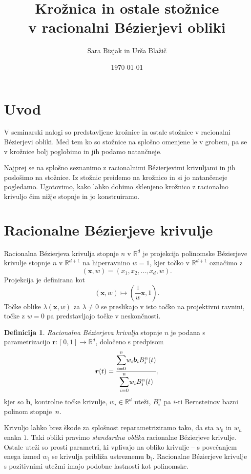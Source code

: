 \documentclass[a4paper,11pt]{article}
\title{Krožnica in ostale stožnice \\
v racionalni B\'ezierjevi obliki
}
\author{Sara Bizjak in Urša Blažič}
\date{\today}
\theoremstyle{definition}
\newtheorem*{definicija}{Definicija}
\theoremstyle{plain}
\begin{document}
\maketitle

\section{Uvod}
V seminarski nalogi so predstavljene krožnice in ostale stožnice v racionalni B\'ezierjevi obliki. Med tem ko so stožnice na splošno omenjene le v grobem, pa se v krožnice bolj poglobimo in jih podamo natančneje.

Najprej se na splošno seznanimo z racionalnimi B\'ezierjevimi krivuljami in jih poslošimo na stožnice. Iz stožnic preidemo na krožnico in si jo natančeneje pogledamo. Ugotovimo, kako lahko dobimo sklenjeno krožnico z racionalno krivuljo čim nižje stopnje in jo konstruiramo.



\section{Racionalne B\'ezierjeve krivulje}

Racionalna B\'ezierjeva krivulja stopnje $n$ v $\mathbb{R}^d$ je projekcija polinomske B\'ezierjeve krivulje stopnje $n$ v $\mathbb{R}^{d+1}$ na hiperravnino $w=1$, kjer točko v  $\mathbb{R}^{d+1}$  označimo z
$$(\boldsymbol{x},w)=(x_1,x_2,\dots,x_d,w).$$
Projekcija je definirana kot
$$(\boldsymbol{x},w)\mapsto (\frac{1}{w}\boldsymbol{x},1).$$
Točke oblike $\lambda(\boldsymbol{x}, w)$ za $\lambda\neq 0$ se preslikajo v isto točko na projektivni ravnini, točke z
$w = 0$ pa predstavljajo točke v neskončnosti.

\begin{definicija}
\emph{Racionalna B\'ezierjeva krivulja} stopnje $n$ je podana s parametrizacijo $\boldsymbol{r}:[0,1]\rightarrow \mathbb{R}^d$, določeno s predpisom
$$\boldsymbol{r}(t)=\frac{\mathlarger{\sum}_{i=0}^n w_i\boldsymbol{b}_iB_i^n(t)}{\mathlarger{\sum}_{i=0}^n w_iB_i^n(t)},$$
kjer so $\boldsymbol{b}_i$ kontrolne točke krivulje, $w_i\in\mathbb{R}^d$ uteži, $B_i^n$ pa $i$-ti Bernsteinov bazni polinom stopnje~$n$.
\end{definicija}
 
Krivuljo lahko brez škode za splošnost reparametriziramo tako, da sta $w_0$ in $w_n$ enaka $1$. Taki obliki pravimo \emph{standardna oblika} racionalne B\'ezierjeve krivulje.
Ostale uteži so prosti parametri, ki vplivajo na obliko krivulje -- s povečanjem enega izmed $w_i$ se krivulja približa ustreznemu $\boldsymbol{b}_i$. Racionalne B\'ezierjeve krivulje s pozitivnimi utežmi imajo podobne lastnosti kot polinomske. 
\end{document}
